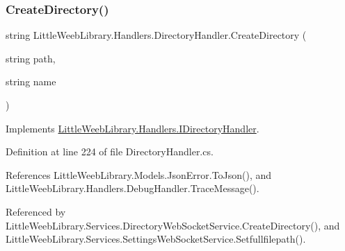 \subsubsection{\texorpdfstring{Create\+Directory()}{CreateDirectory()}}
{\footnotesize\ttfamily string Little\+Weeb\+Library.\+Handlers.\+Directory\+Handler.\+Create\+Directory (\begin{DoxyParamCaption}\item[{string}]{path,  }\item[{string}]{name }\end{DoxyParamCaption})}



Implements \mbox{\hyperlink{interface_little_weeb_library_1_1_handlers_1_1_i_directory_handler_aa2298db37f9e9a6050d01be4d3150889}{Little\+Weeb\+Library.\+Handlers.\+I\+Directory\+Handler}}.



Definition at line 224 of file Directory\+Handler.\+cs.



References Little\+Weeb\+Library.\+Models.\+Json\+Error.\+To\+Json(), and Little\+Weeb\+Library.\+Handlers.\+Debug\+Handler.\+Trace\+Message().



Referenced by Little\+Weeb\+Library.\+Services.\+Directory\+Web\+Socket\+Service.\+Create\+Directory(), and Little\+Weeb\+Library.\+Services.\+Settings\+Web\+Socket\+Service.\+Setfullfilepath().


